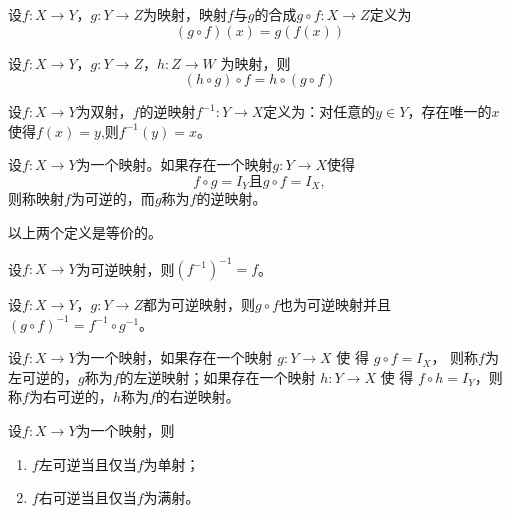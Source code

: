   \begin{Def}
    设$f:X\to Y$，$g:Y\to Z$为映射，映射$f$与$g$的合成$g\circ f:X\to Z$定义为\[(g\circ f)(x) = g(f(x))\]
  \end{Def}
\begin{Thm}
  设$f:X \to Y$，$g:Y\to Z$，$h:Z\to W$ 为映射，则 \[ (h \circ g) \circ f = h \circ (g \circ f) \]
\end{Thm}

  \begin{Def}
     设$f:X\to Y$为双射，$f$的逆映射$f^{-1}:Y\to X$定义为：对任意的$y\in Y$，存在唯一的$x$使得$f(x)=y$,则$f^{-1}(y)=x$。
   \end{Def}
    \begin{Def}
     设$f:X\to Y$为一个映射。如果存在一个映射$g:Y\to X$使得\[f\circ g = I_{Y} \text{且} g\circ f = I_{X},\]则称映射$f$为可逆的，而$g$称为$f$的逆映射。
   \end{Def}
   以上两个定义是等价的。

     \begin{Thm}
    设$f:X\to Y$为可逆映射，则$(f^{-1})^{-1}=f$。
  \end{Thm}
  \begin{Thm}
    设$f:X\to Y$，$g:Y\to Z$都为可逆映射，则$g\circ f$也为可逆映射并且$(g\circ f)^{-1} = f^{-1}\circ g^{-1}$。
  \end{Thm}

    \begin{Def}
    设$f:X\to Y$为一个映射，如果存在一个映射 $g:Y\to X$ 使 得 $g\circ f = I_X$，
    则称$f$为左可逆的，$g$称为$f$的左逆映射；如果存在一个映射
    $h:Y\to X$ 使 得 $f\circ h=I_Y$，则称$f$为右可逆的，$h$称为$f$的右逆映射。
  \end{Def}
  \begin{Thm}
    设$f:X\to Y$为一个映射，则
    \begin{enumerate}
    \item $f$左可逆当且仅当$f$为单射；
    \item $f$右可逆当且仅当$f$为满射。
    \end{enumerate}
  \end{Thm}

